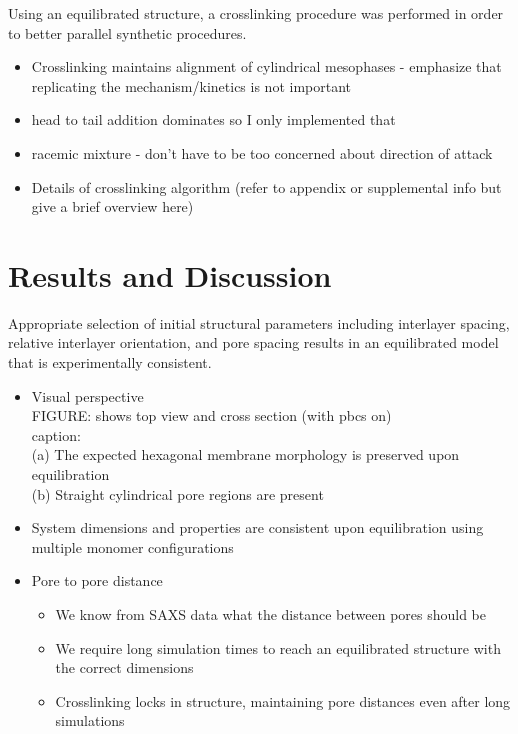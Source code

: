 \documentclass{article}
\begin{document}
\begin{itemize}
	Using an equilibrated structure, a crosslinking procedure was performed in order to better parallel synthetic procedures. 
	\begin{itemize}
		\item Crosslinking maintains alignment of cylindrical mesophases - emphasize that replicating the mechanism/kinetics is not important 
		\item head to tail addition dominates so I only implemented that
		\item racemic mixture - don't have to be too concerned about direction of attack 
		\item Details of crosslinking algorithm (refer to appendix or supplemental info but give a brief overview here)
	\end{itemize}  
	
	\section{Results and Discussion}
	
	Appropriate selection of initial structural parameters including interlayer spacing, relative interlayer orientation, and pore spacing results in an equilibrated model that is experimentally consistent.
	\begin{itemize}
		\item Visual perspective \\
		FIGURE: shows top view and cross section (with pbcs on)\\
		caption: \\ 
		(a) The expected hexagonal membrane morphology is preserved upon equilibration \\
		(b) Straight cylindrical pore regions are present \\
		\item System dimensions and properties are consistent upon equilibration using multiple monomer configurations 
		\item Pore to pore distance
		\begin{itemize}
			\item We know from SAXS data what the distance between pores should be
			\item We require long simulation times to reach an equilibrated structure with the correct dimensions
			\item Crosslinking locks in structure, maintaining pore distances even after long simulations
		\end{itemize}


\end{itemize}
\end{itemize}
\end{document}
